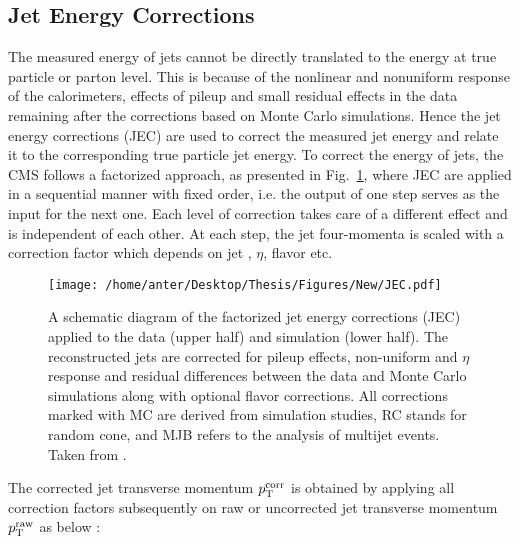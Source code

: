 \subsection{Jet Energy Corrections}
\label{sec:jet_corrections}
The measured energy of jets cannot be directly translated to the energy at true particle or parton level. This is because of the nonlinear and nonuniform response of the calorimeters, effects of pileup and small residual effects in the data remaining after the corrections based on Monte Carlo simulations. Hence the jet energy corrections (JEC) \cite{Chatrchyan:2011ds, Khachatryan:2016kdb} are used to correct the measured jet energy and relate it to the corresponding true particle jet energy. To correct the energy of jets, the CMS follows a factorized approach, as presented in Fig.~\ref{fig:jec}, where JEC are applied in a sequential manner with fixed order, i.e. the output of one step serves as the input for the next one. Each level of correction takes care of a different effect and is independent of each other. At each step, the jet four-momenta is scaled with a correction factor which depends on jet \pt, $\eta$, flavor etc.

\begin{figure}[!h]
 \begin{center}
 \vspace*{4mm} 
 \hspace*{-11mm}
 \texttt{[image: /home/anter/Desktop/Thesis/Figures/New/JEC.pdf]}\\
 \vspace*{5mm}
 \caption[A schematic diagram of the factorized jet energy corrections (JEC).]{A schematic diagram of the factorized jet energy corrections (JEC) applied to the data (upper half) and simulation (lower half). The reconstructed jets are corrected for pileup effects, non-uniform \pt and $\eta$ response and residual differences between the data and Monte Carlo simulations along with optional flavor corrections. All corrections marked with MC are derived from simulation studies, RC stands for random cone, and MJB refers to the analysis of multijet events. Taken from \cite{Khachatryan:2016kdb}.}
 \label{fig:jec}
 \end{center}
\end{figure}

The corrected jet transverse momentum $p^{\rm corr}_{\rm T}$ is obtained by applying all correction factors subsequently on raw or uncorrected jet transverse momentum $p^{\rm raw}_{\rm T}$ as below :

